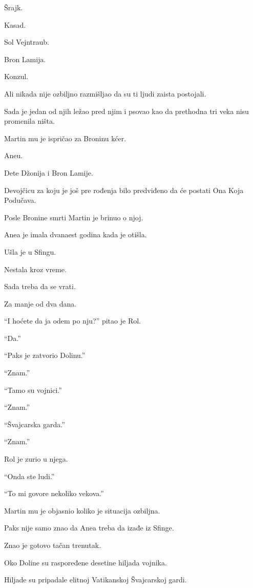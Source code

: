 Šrajk.

Kasad.

Sol Vejntraub.

Bron Lamija.

Konzul.

Ali nikada nije ozbiljno razmišljao da su ti ljudi zaista postojali.

Sada je jedan od njih ležao pred njim i psovao kao da prethodna tri veka nisu promenila ništa.

\bigskip

Martin mu je ispričao za Broninu kćer.

Aneu.

Dete Džonija i Bron Lamije.

Devojčicu za koju je još pre rođenja bilo predviđeno da će postati Ona Koja Podučava.

\bigskip

Posle Bronine smrti Martin je brinuo o njoj.

Anea je imala dvanaest godina kada je otišla.

Ušla je u Sfingu.

Nestala kroz vreme.

\bigskip

Sada treba da se vrati.

Za manje od dva dana.

\bigskip

``I hoćete da ja odem po nju?'' pitao je Rol.

``Da.''

``Paks je zatvorio Dolinu.''

``Znam.''

``Tamo su vojnici.''

``Znam.''

``Švajcarska garda.''

``Znam.''

Rol je zurio u njega.

``Onda ste ludi.''

``To mi govore nekoliko vekova.''

\bigskip

Martin mu je objasnio koliko je situacija ozbiljna.

Paks nije samo znao da Anea treba da izađe iz Sfinge.

Znao je gotovo tačan trenutak.

Oko Doline su raspoređene desetine hiljada vojnika.

Hiljade su pripadale elitnoj Vatikanskoj Švajcarskoj gardi.

